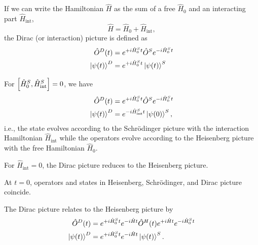 \begin{definition}
	If we can write the Hamiltonian $\hat{H}$ as the sum of a free $\hat{H}_0$ and an interacting part $\hat{H}_\text{int}$,
	\begin{equation}
		\hat{H}
		=
		\hat{H}_0
		+
		\hat{H}_\text{int}
		,
	\end{equation}
	the Dirac (or interaction) picture is defined as
	\begin{align}
		\hat{O}^D(t)
		&=
		e^{+i\hat{H}_0^St}
		\hat{O}^S
		e^{-i\hat{H}_0^St}
		\\
		\ket{\psi(t)}^D
		&=
		e^{+i\hat{H}_0^St}
		\ket{\psi(t)}^S
	\end{align}
\end{definition}
\begin{remark}
	For $\comm{\hat{H}_0^S}{\hat{H}_\text{int}^S}=0$, we have
	\begin{align}
		\hat{O}^D(t)
		&=
		e^{+i\hat{H}_0^St}
		\hat{O}^S
		e^{-i\hat{H}_0^St}
		\\
		\ket{\psi(t)}^D
		&=
		e^{-i\hat{H}_\text{int}^St}
		\ket{\psi(0)}^S
		,
	\end{align}
	i.e., the state evolves according to the Schrödinger picture with the interaction Hamiltonian $\hat{H}_\text{int}$ while the operators evolve according to the Heisenberg picture with the free Hamiltonian $\hat{H}_0$.
\end{remark}
\begin{corollary}
	For $\hat{H}_\text{int}=0$, the Dirac picture reduces to the Heisenberg picture.
\end{corollary}
\begin{corollary}
	At $t=0$, operators and states in Heisenberg, Schrödinger, and Dirac picture coincide.
\end{corollary}
\begin{lemma}
	The Dirac picture relates to the Heisenberg picture by
	\begin{align}
		\hat{O}^D(t)
		&=
		e^{+i\hat{H}_0^St}
		e^{-i\hat{H}t}
		\hat{O}^H(t)
		e^{+i\hat{H}t}
		e^{-i\hat{H}_0^St}
		\\
		\ket{\psi(t)}^D
		&=
		e^{+i\hat{H}_0^St}
		e^{-i\hat{H}t}
		\ket{\psi(t)}^S
		.
	\end{align}
\end{lemma}


